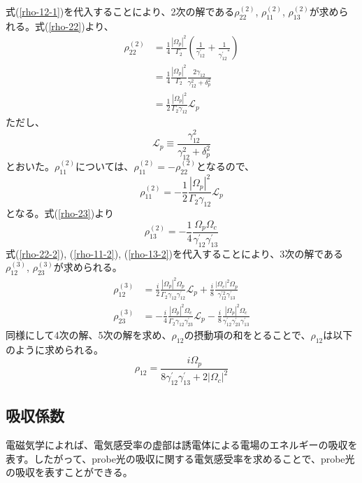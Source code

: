 \documentclass[dvipdfmx]{jsreport}
\begin{document}
式(\ref{rho-12-1})を代入することにより、2次の解である$\rho_{22}^{(2)}$, $\rho_{11}^{(2)}$, $\rho_{13}^{(2)}$が求められる。式(\ref{rho-22})より、
\begin{equation}
\begin{split}
\label{rho-22-2}
    \rho_{22}^{(2)} &= \frac{1}{4}\frac{|\Omega_p|^2}{\Gamma_2} \left( \frac{1}{\gamma_{12}^{'}} + \frac{1}{{\gamma_{12}^{'}}^*} \right) \\
    &= \frac{1}{4}\frac{|\Omega_p|^2}{\Gamma_2} \frac{2\gamma_{12}}{\gamma_{12}^2 + \delta_{p}^2} \\
    &= \frac{1}{2}\frac{|\Omega_p|^2}{\Gamma_2 \gamma_{12}} \mathcal{L}_p
\end{split}
\end{equation}
ただし、
\begin{equation}
    \mathcal{L}_p \equiv \frac{\gamma_{12}^2}{\gamma_{12}^2 + \delta_{p}^2}
\end{equation}
とおいた。$\rho_{11}^{(2)}$については、$\rho_{11}^{(2)} = -\rho_{22}^{(2)}$となるので、
\begin{equation}
\label{rho-11-2}
\rho_{11}^{(2)} = -\frac{1}{2} \frac{|\Omega_p|^2}{\Gamma_2 \gamma_{12}} \mathcal{L}_p
\end{equation}
となる。式(\ref{rho-23})より
\begin{equation}
\label{rho-13-2}
\rho_{13}^{(2)} = -\frac{1}{4}\frac{\Omega_p \Omega_c}{\gamma_{12}^{'} \gamma_{13}^{'}} 
\end{equation}
式(\ref{rho-22-2}), (\ref{rho-11-2}), (\ref{rho-13-2})を代入することにより、3次の解である$\rho_{12}^{(3)}$, $\rho_{23}^{(3)}$が求められる。
\begin{align}
\label{rho-12-3}
\rho_{12}^{(3)} &= \frac{i}{2} \frac{|\Omega_p|^2 \Omega_p}{\Gamma_2 \gamma_{12} \gamma_{12}^{'}} \mathcal{L}_p +  \frac{i}{8} \frac{|\Omega_c|^2 \Omega_p}{\gamma_{12}^{'2} \gamma_{13}^{'}} \\
\rho_{23}^{(3)} &= -\frac{i}{4} \frac{|\Omega_p|^2 \Omega_c}{\Gamma_2 \gamma_{12} \gamma_{23}^{'}} \mathcal{L}_p -  \frac{i}{8} \frac{|\Omega_p|^2 \Omega_c}{\gamma_{12}^{'} \gamma_{23}^{'} \gamma_{13}^{'}}
\end{align}
同様にして4次の解、5次の解を求め、$\rho_{12}$の摂動項の和をとることで、$\rho_{12}$は以下のように求められる。\cite{eit-absorption}
\begin{equation}
    \rho_{12} = \frac{i\Omega_p}{8\gamma_{12}^{'}\gamma_{13}^{'} + 2|\Omega_c|^2}
\end{equation}


\subsection{吸収係数}
電磁気学によれば、電気感受率の虚部は誘電体による電場のエネルギーの吸収を表す。\cite{nagaoka-yosuke}したがって、probe光の吸収に関する電気感受率を求めることで、probe光の吸収を表すことができる。
\end{document}
